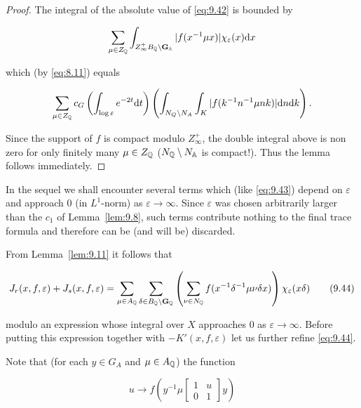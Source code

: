 \begin{proof}

The integral of the absolute value of \eqref{eq:9.42} is bounded by

\[
\sum_{\mu \in Z_{\mathbb{Q}}}\int_{Z_\infty^{+}B_{\mathbb{Q}} \backslash \mathbf{G}_{\mathbb{A}}} |f(x^{-1}\mu x)|\chi_\varepsilon(x)\mathrm{d} x
\]

which (by \eqref{eq:8.11}) equals

\[
\sum_{\mu \in Z_{\mathbb{Q}}} c_G\left(\int_{\log \varepsilon} e^{-2t}\mathrm{d} t\right)\left(\int_{N_Q \backslash N_A}\int_K |f(k^{-1}n^{-1}\mu nk)|\mathrm{d} n\mathrm{d} k\right).
\]

Since the support of $f$ is compact modulo $Z_\infty^{+}$, the double integral above is non zero for only finitely many $\mu \in Z_{\mathbb{Q}}$ ($N_{\mathbb{Q}} \setminus N_{\mathbb{A}}$ is compact!). Thus the lemma follows immediately.

\end{proof}

\begin{remark}\label{rem:9.12}

In the sequel we shall encounter several terms which (like \eqref{eq:9.43}) depend on $\varepsilon$ and approach 0 (in $L^1$-norm) as $\varepsilon \to \infty$. Since $\varepsilon$ was chosen arbitrarily larger than the $c_1$ of Lemma~\ref{lem:9.8}, such terms contribute nothing to the final trace formula and therefore can be (and will be) discarded.

\end{remark}

From Lemma~\ref{lem:9.11} it follows that

\begin{equation}\label{eq:9.44}
J_r(x, f, \varepsilon) + J_s(x, f, \varepsilon) = \sum_{\mu \in A_{\mathbb{Q}}}\sum_{\delta \in B_{\mathbb{Q}} \backslash \mathbf{G}_{\mathbb{Q}}}\left(\sum_{\nu \in N_{\mathbb{Q}}} f(x^{-1}\delta^{-1}\mu\nu\delta x)\right)\chi_\varepsilon(x\delta)\tag{9.44}
\end{equation}

modulo an expression whose integral over $X$ approaches 0 as $\varepsilon \to \infty$. Before putting this expression together with $-K'(x, f, \varepsilon)$ let us further refine \eqref{eq:9.44}.

Note that (for each $y \in G_A$ and $\mu \in A_{\mathbb{Q}}$) the function

\[
u \to f\left(y^{-1}\mu\begin{bmatrix} 1 & u \\ 0 & 1 \end{bmatrix}y\right)
\]

